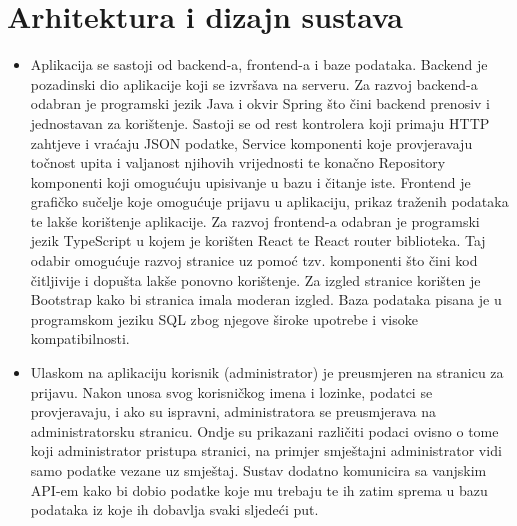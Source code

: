 \chapter{Arhitektura i dizajn sustava}
		

	\begin{itemize}
		\item 	%
		Aplikacija se sastoji od backend-a, frontend-a i baze podataka. \newline Backend je pozadinski dio aplikacije koji se izvršava na serveru. Za razvoj backend-a odabran je programski jezik Java i okvir Spring što čini backend prenosiv i jednostavan za korištenje. Sastoji se od rest kontrolera koji primaju HTTP zahtjeve i vraćaju JSON podatke, Service komponenti koje provjeravaju točnost upita i valjanost njihovih vrijednosti te konačno Repository komponenti koji omogućuju upisivanje u bazu i čitanje iste. \newline Frontend je grafičko sučelje koje omogućuje prijavu u aplikaciju, prikaz traženih podataka te lakše korištenje aplikacije. Za razvoj frontend-a odabran je programski jezik TypeScript u kojem je korišten React te React router biblioteka. Taj odabir omogućuje razvoj stranice uz pomoć tzv. komponenti što čini kod čitljivije i dopušta lakše ponovno korištenje. Za izgled stranice korišten je Bootstrap kako bi stranica imala moderan izgled. \newline Baza podataka pisana je u programskom jeziku SQL zbog njegove široke upotrebe i visoke kompatibilnosti.
		\item	%
		Ulaskom na aplikaciju korisnik (administrator) je preusmjeren na stranicu za prijavu. Nakon unosa svog korisničkog imena i lozinke, podatci se provjeravaju, i ako su ispravni, administratora se preusmjerava na administratorsku stranicu. Ondje su prikazani različiti podaci ovisno o tome koji administrator pristupa stranici, na primjer smještajni administrator vidi samo podatke vezane uz smještaj. \newline Sustav dodatno komunicira sa vanjskim API-em kako bi dobio podatke koje mu trebaju te ih zatim sprema u bazu podataka iz koje ih dobavlja svaki sljedeći put. 

\end{itemize}
